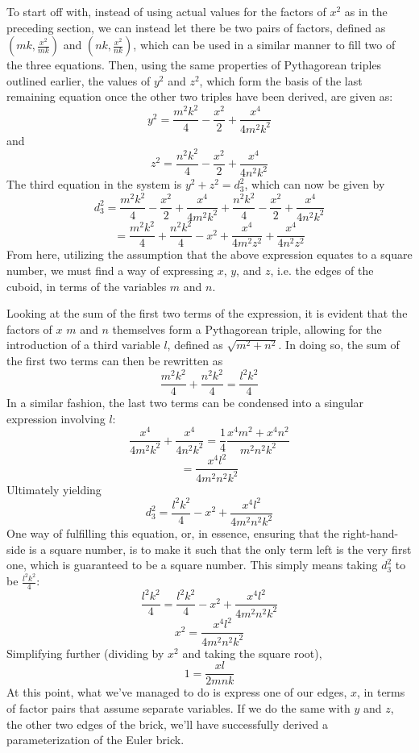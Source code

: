 \documentclass[11pt]{article}
\begin{document}
To start off with, instead of using actual values for the factors of $x^2$ as in the preceding section, we can instead let there be two pairs of factors, defined as $(mk, \frac{x^2}{mk})$ and $(nk, \frac{x^2}{nk})$, which can be used in a similar manner to fill two of the three equations. Then, using the same properties of Pythagorean triples outlined earlier, the values of $y^2$ and $z^2$, which form the basis of the last remaining equation once the other two triples have been derived, are given as:
$$y^2=\frac{m^2k^2}{4}-\frac{x^2}{2}+\frac{x^4}{4m^2k^2}$$
and 
$$z^2=\frac{n^2k^2}{4}-\frac{x^2}{2}+\frac{x^4}{4n^2k^2}$$
The third equation in the system is $y^2+z^2=d_3^2$, which can now be given by 
$$d_3^2=\frac{m^2k^2}{4}-\frac{x^2}{2}+\frac{x^4}{4m^2k^2}+\frac{n^2k^2}{4}-\frac{x^2}{2}+\frac{x^4}{4n^2k^2}$$
$$=\frac{m^2k^2}{4}+\frac{n^2k^2}{4}-x^2+\frac{x^4}{4m^2z^2}+\frac{x^4}{4n^2z^2}$$
From here, utilizing the assumption that the above expression equates to a square number, we must find a way of expressing $x$, $y$, and $z$, i.e. the edges of the cuboid, in terms of the variables $m$ and $n$.

Looking at the sum of the first two terms of the expression, it is evident that the factors of $x$ $m$ and $n$ themselves form a Pythagorean triple, allowing for the introduction of a third variable $l$, defined as $\sqrt{m^2+n^2}$. In doing so, the sum of the first two terms can then be rewritten as
$$\frac{m^2k^2}{4}+\frac{n^2k^2}{4}=\frac{l^2k^2}{4}$$
In a similar fashion, the last two terms can be condensed into a singular expression involving $l$:
$$\frac{x^4}{4m^2k^2}+\frac{x^4}{4n^2k^2}=\frac{1}{4}\frac{x^4m^2+x^4n^2}{m^2n^2k^2}$$
$$=\frac{x^4l^2}{4m^2n^2k^2}$$
Ultimately yielding
$$d_3^2=\frac{l^2k^2}{4}-x^2+\frac{x^4l^2}{4m^2n^2k^2}$$
One way of fulfilling this equation, or, in essence, ensuring that the right-hand-side is a square number, is to make it such that the only term left is the very first one, which is guaranteed to be a square number. This simply means taking $d_3^2$ to be $\frac{l^2k^2}{4}$:
$$\frac{l^2k^2}{4}=\frac{l^2k^2}{4}-x^2+\frac{x^4l^2}{4m^2n^2k^2}$$
$$x^2=\frac{x^4l^2}{4m^2n^2k^2}$$
Simplifying further (dividing by $x^2$ and taking the square root), 
$$1=\frac{xl}{2mnk}$$
At this point, what we've managed to do is express one of our edges, $x$, in terms of factor pairs that assume separate variables. If we do the same with $y$ and $z$, the other two edges of the brick, we'll have successfully derived a parameterization of the Euler brick. 
\end{document}
